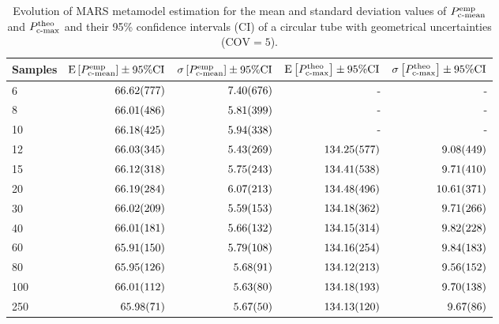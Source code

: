 \documentclass[12pt,number,preprint,review,times]{elsarticle}
\begin{document}
\begin{table}[!htpb]
\begin{center}
\begin{tabular}[t]{lrrrr} \toprule
Samples &	$\mathrm{E}\left[P^{\mathrm{emp}}_{\mathrm{c{\text -}mean}}\right] \pm 95\% \mathrm{CI}$ &	$\sigma\left[P^{\mathrm{emp}}_{\mathrm{c{\text -}mean}}\right] \pm 95\% \mathrm{CI}$	&	$\mathrm{E}\left[P^{\mathrm{theo}}_{\mathrm{c{\text -}max}}\right] \pm 95\% \mathrm{CI}$ &	$\sigma\left[P^{\mathrm{theo}}_{\mathrm{c{\text -}max}}\right] \pm 95\% \mathrm{CI}$ \\\midrule
6	& $\SI{66,62 \pm	7,77}{}  $ &	$\SI{7,40 \pm 6,76}{}$ &  - & - \\
8	& $\SI{66,01 \pm	4,86}{} $  &	$\SI{5,81 \pm 3,99}{}$ &  - & - \\
10	& $\SI{66,18 \pm	4,25}{}  $ &	$\SI{5,94 \pm 3,38}{}$ &  - & - \\
12	& $\SI{66,03 \pm	3,45}{} $  &	$\SI{5,43 \pm 2,69}{}$ & $\SI{134,25 \pm 5,77}{}$ &	$\SI{9,08 \pm 4,49}{}$ \\
15	& $\SI{66,12 \pm	3,18}{}  $ &	$\SI{5,75 \pm 2,43}{}$ & $\SI{134,41 \pm 5,38}{}$ &	$\SI{9,71 \pm 4,10}{}$ \\
20	& $\SI{66,19 \pm	2,84}{} $  &	$\SI{6,07 \pm 2,13}{}$ & $\SI{134,48 \pm 4,96}{}$ &	$\SI{10,61\pm 3,71}{}$ \\
30	& $\SI{66,02 \pm	2,09}{}  $ &	$\SI{5,59 \pm 1,53}{}$ & $\SI{134,18 \pm 3,62}{}$ &	$\SI{9,71 \pm 2,66}{}$ \\
40	& $\SI{66,01 \pm	1,81}{} $  &	$\SI{5,66 \pm 1,32}{}$ & $\SI{134,15 \pm 3,14}{}$ &	$\SI{9,82 \pm 2,28}{}$ \\
60	& $\SI{65,91 \pm	1,50}{}  $ &	$\SI{5,79 \pm 1,08}{}$ & $\SI{134,16 \pm 2,54}{}$ &	$\SI{9,84 \pm 1,83}{}$ \\
80	& $\SI{65,95 \pm	1,26}{} $  &	$\SI{5,68 \pm 0,91}{}$ & $\SI{134,12 \pm 2,13}{}$ &	$\SI{9,56 \pm 1,52}{}$ \\
100	& $\SI{66,01 \pm	1,12}{}  $ &	$\SI{5,63 \pm 0,80}{}$ & $\SI{134,18 \pm 1,93}{}$ &	$\SI{9,70 \pm 1,38}{}$ \\
250	& $\SI{65,98 \pm	0,71}{} $  &	$\SI{5,67 \pm 0,50}{}$ & $\SI{134,13 \pm 1,20}{}$ &	$\SI{9,67 \pm 0,86}{}$ \\
\bottomrule
\end{tabular}
\captionsetup{justification=centering}
\caption{Evolution of MARS metamodel estimation for the mean and standard deviation values of $P^{\mathrm{emp}}_{\mathrm{c{\text -}mean}}$ and $P^{\mathrm{theo}}_{\mathrm{c{\text -}max}}$ and their 95\% confidence intervals (CI) of a circular tube with geometrical uncertainties ($\mathrm{COV} = 5$).}
\label{tab:mars}
\end{center}
\end{table}
\end{document}
